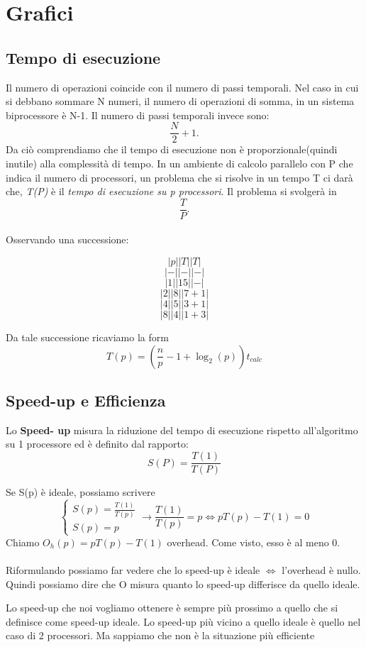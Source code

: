 \documentclass{article}
\begin{document}
\section{Grafici}
\subsection{Tempo di esecuzione}

Il numero di operazioni coincide con il numero di passi temporali. Nel caso in cui si debbano sommare N numeri, il numero di operazioni di somma, in un sistema biprocessore è N-1. Il numero di passi temporali invece sono: $$ \frac{N}{2} +1. $$Da ciò comprendiamo che il tempo di esecuzione non è proporzionale(quindi inutile) alla complessità di tempo.
In un ambiente di calcolo parallelo con P che indica il numero di processori, un problema che si risolve in un tempo T ci darà che, \textit{T(P)} è il \textit{tempo di esecuzione su p processori}. Il problema si svolgerà in $$ \frac{T}{P}. $$ \\

Osservando una successione:

$$|p| |T| |T|$$
$$|-| |-| |-|$$
$$|1| |15| |-|$$
$$|2| |8| |7+1|$$
$$|4| |5| |3+1|$$
$$|8| |4| |1+3|$$

Da tale successione ricaviamo la form
$$T(p)=(\frac{n}{p}-1 + \log_2(p))t_{calc} $$


\subsection{Speed-up e Efficienza}

Lo \textbf{Speed- up} misura la riduzione del tempo di esecuzione rispetto all'algoritmo su 1 processore ed è definito dal rapporto:
$$ S(P) = \frac{T(1)}{T(P)} $$ 

Se S(p) è ideale, possiamo scrivere
$$ 
\begin{cases} 
S(p) = \frac{T(1)}{T(p)}\\
S(p) = p
\end{cases}
\rightarrow
\frac{T(1)}{T(p)} = p \iff pT(p) -T(1) = 0
$$
Chiamo  $O_h(p) = pT(p) - T(1)$ overhead. Come visto, esso è al meno 0.\\
\\
Riformulando possiamo far vedere che lo speed-up è ideale $\iff$ l'overhead è nullo.\\
Quindi possiamo dire che O  misura quanto lo speed-up differisce da quello ideale.

Lo speed-up che noi vogliamo ottenere è sempre più prossimo a quello che si definisce come speed-up ideale.
Lo speed-up più vicino a quello ideale è quello nel caso di 2 processori. Ma sappiamo che non è la situazione più efficiente
\end{document}

